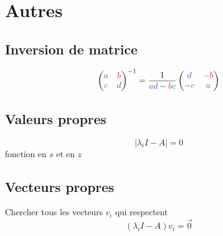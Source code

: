 \documentclass[resume]{subfiles}
\begin{document}
\section{Autres}
\subsection{Inversion de matrice}
$$\begin{pmatrix}
\textcolor{RoyalBlue}{a} & \textcolor{OrangeRed}{b}\\
\textcolor{ForestGreen}{c} & \textcolor{Violet}{d}
\end{pmatrix}^{-1}=\frac{1}{\textcolor{RoyalBlue}{a}\textcolor{Violet}{d}-\textcolor{OrangeRed}{b}\textcolor{ForestGreen}{c}}\begin{pmatrix}
\textcolor{Violet}{d} & \textcolor{OrangeRed}{-b}\\
\textcolor{ForestGreen}{-c} & \textcolor{RoyalBlue}{a}
\end{pmatrix}$$
\subsection{Valeurs propres}
$$\left|\lambda_i I - A\right|=0$$
fonction en $s$ et en $z$
\subsection{Vecteurs propres}
Chercher tous les vecteurs $v_i$ qui respectent
$$(\lambda_i I - A)v_i=\vec{0}$$
\end{document}
